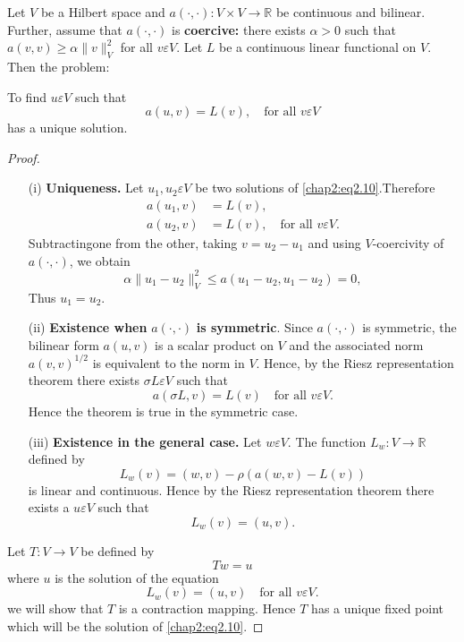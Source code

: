 \setcounter{THM}{0}
\begin{THM}\label{chap2:THM1}
Let $V$ be a Hilbert space and $a(\cdotp,\cdotp):V\times
V\to\mathbb{R}$ be continuous and bilinear. Further, assume that
$a(\cdotp,\cdotp)$ is {\bf coercive:} there exists $\alpha >0$ such
that $a(v, v)\geq\alpha\parallel v\parallel^2_V$ for all $v\varepsilon
V$. Let $L$ be a continuous linear functional on $V$. Then the
problem:

To find $u\varepsilon V$ such that 
\begin{equation}\label{chap2:eq2.10}
a(u, v)=L(v), \quad \text{for all } v\varepsilon V
\end{equation}
has a unique solution.
\end{THM}

\begin{proof}
\begin{itemize}
\item [(i)] {\bf Uniqueness.} Let $u_1, u_2 \varepsilon V$ be two
solutions of \eqref{chap2:eq2.10}.\break Therefore
\begin{align*}
a(u_1, v) &= L(v),\\
a(u_2, v) &= L(v), \quad \text{for all } v\varepsilon V.
\end{align*}
Subtracting\pageoriginale one from the other, taking $v=u_2-u_1$ and
using $V$-coercivity of $a(\cdotp,\cdotp)$, we obtain
$$
\alpha\parallel u_1-u_2\parallel_V^2\leq a(u_1-u_2, u_1-u_2)=0,
$$
Thus $u_1=u_2$.
\item [(ii)] {\bf Existence when} $a(\cdotp,\cdotp)$ {\bf is
  symmetric}. Since $a(\cdotp,\cdotp)$ is symmetric, the bilinear form
  $a(u, v)$ is a scalar product on $V$ and the associated norm $a(v,
  v)^{1/2}$ is equivalent to the norm in $V$. Hence, by the Riesz
  representation theorem there exists $\sigma L \varepsilon V$ such
  that 
$$
a(\sigma L, v)=L(v) \quad \text{for all } v\varepsilon V.
$$
Hence the theorem is true in the symmetric case.
\item [(iii)] {\bf Existence in the general case.} Let $w\varepsilon
  V$. The function $L_w:V\to\mathbb{R}$ defined by 
$$
L_w(v)=(w, v)-\rho(a(w, v)-L(v))
$$
is linear and continuous. Hence by the Riesz representation theorem
there exists a $u \varepsilon V$ such that 
$$
L_w(v)=(u, v).
$$
\end{itemize}

Let $T:V\to V$ be defined by 
$$
Tw=u
$$
where $u$ is the solution of the equation
$$
L_w(v)=(u, v) \quad \text{for all } v \varepsilon V.
$$\pageoriginale
we will show that $T$ is a contraction mapping. Hence $T$ has a unique
fixed point which will be the solution of \eqref{chap2:eq2.10}.


\end{proof}
